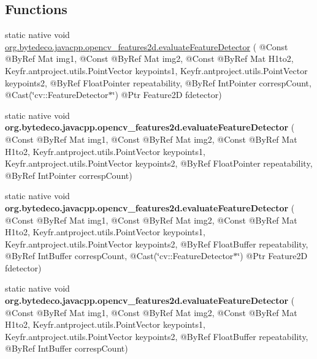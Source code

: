 \subsection*{Functions}
\begin{DoxyCompactItemize}
\item 
static native void \hyperlink{group__features2d_gaae7a705a66cbdd0ed99122fe183a0e03}{org.\+bytedeco.\+javacpp.\+opencv\+\_\+features2d.\+evaluate\+Feature\+Detector} ( @Const @By\+Ref Mat img1, @Const @By\+Ref Mat img2, @Const @By\+Ref Mat H1to2, Key\+fr.antproject.utils.Point\+Vector keypoints1, Key\+fr.antproject.utils.Point\+Vector keypoints2, @By\+Ref Float\+Pointer repeatability, @By\+Ref Int\+Pointer corresp\+Count, @Cast(\char`\"{}cv\+::\+Feature\+Detector$\ast$\char`\"{}) @Ptr Feature2D fdetector)
\item 
\mbox{\label{group__features2d_gaf598582f1ca50030005c9b845421d8be}} 
static native void {\bfseries org.\+bytedeco.\+javacpp.\+opencv\+\_\+features2d.\+evaluate\+Feature\+Detector} ( @Const @By\+Ref Mat img1, @Const @By\+Ref Mat img2, @Const @By\+Ref Mat H1to2, Key\+fr.antproject.utils.Point\+Vector keypoints1, Key\+fr.antproject.utils.Point\+Vector keypoints2, @By\+Ref Float\+Pointer repeatability, @By\+Ref Int\+Pointer corresp\+Count)
\item 
\mbox{\label{group__features2d_gac21f8a8809949cfd0cdd35759c85f183}} 
static native void {\bfseries org.\+bytedeco.\+javacpp.\+opencv\+\_\+features2d.\+evaluate\+Feature\+Detector} ( @Const @By\+Ref Mat img1, @Const @By\+Ref Mat img2, @Const @By\+Ref Mat H1to2, Key\+fr.antproject.utils.Point\+Vector keypoints1, Key\+fr.antproject.utils.Point\+Vector keypoints2, @By\+Ref Float\+Buffer repeatability, @By\+Ref Int\+Buffer corresp\+Count, @Cast(\char`\"{}cv\+::\+Feature\+Detector$\ast$\char`\"{}) @Ptr Feature2D fdetector)
\item 
\mbox{\label{group__features2d_ga5606fe8a99975588d8dd5148cf8ef90e}} 
static native void {\bfseries org.\+bytedeco.\+javacpp.\+opencv\+\_\+features2d.\+evaluate\+Feature\+Detector} ( @Const @By\+Ref Mat img1, @Const @By\+Ref Mat img2, @Const @By\+Ref Mat H1to2, Key\+fr.antproject.utils.Point\+Vector keypoints1, Key\+fr.antproject.utils.Point\+Vector keypoints2, @By\+Ref Float\+Buffer repeatability, @By\+Ref Int\+Buffer corresp\+Count)
\item 
\mbox{\label{group__features2d_ga85783088824e7c07c9496de97635fbcc}} 

\end{DoxyCompactItemize}
